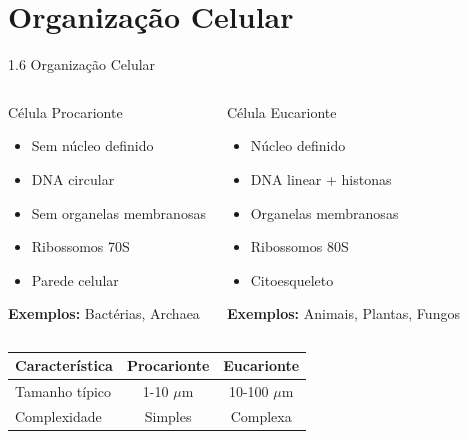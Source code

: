 \section{Organização Celular}

\begin{frame}[allowframebreaks]{1.6 Organização Celular}
\begin{columns}
\begin{block}{Célula Procarionte}
\begin{itemize}
    \item Sem núcleo definido
    \item DNA circular
    \item Sem organelas membranosas
    \item Ribossomos 70S
    \item Parede celular
\end{itemize}
\textbf{Exemplos:} Bactérias, Archaea
\end{block}

\begin{block}{Célula Eucarionte}
\begin{itemize}
    \item Núcleo definido
    \item DNA linear + histonas
    \item Organelas membranosas
    \item Ribossomos 80S
    \item Citoesqueleto
\end{itemize}
\textbf{Exemplos:} Animais, Plantas, Fungos
\end{block}
\end{columns}

\vspace{0.5cm}

\begin{center}
\begin{tabular}{lcc}
\toprule
\textbf{Característica} & \textbf{Procarionte} & \textbf{Eucarionte} \\
\midrule
Tamanho típico & 1-10 $\mu$m & 10-100 $\mu$m \\
Complexidade & Simples & Complexa \\
\bottomrule
\end{tabular}
\end{center}
\end{frame}

